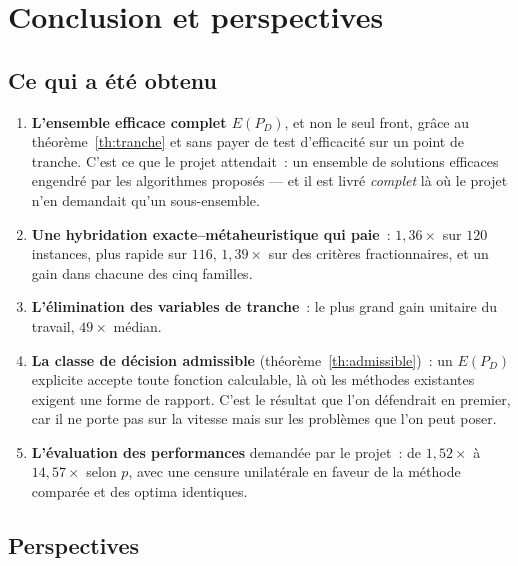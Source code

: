 \documentclass[12pt,a4paper]{report}
\newcommand{\E}{E(P_D)}
\theoremstyle{plain}
\theoremstyle{definition}
\begin{document}
\chapter{Conclusion et perspectives}

\section{Ce qui a été obtenu}

\begin{enumerate}[itemsep=4pt]
\item \textbf{L'ensemble efficace complet $\E$}, et non le seul front, grâce au
      théorème~\ref{th:tranche} et sans payer de test d'efficacité sur un point
      de tranche.  C'est ce que le projet attendait~: un ensemble de solutions
      efficaces engendré par les algorithmes proposés --- et il est livré
      \emph{complet} là où le projet n'en demandait qu'un sous-ensemble.
\item \textbf{Une hybridation exacte--métaheuristique qui paie}~: $1{,}36\times$
      sur $120$ instances, plus rapide sur $116$, $1{,}39\times$ sur des
      critères fractionnaires, et un gain dans chacune des cinq familles.
\item \textbf{L'élimination des variables de tranche}~: le plus grand gain
      unitaire du travail, $49\times$ médian.
\item \textbf{La classe de décision admissible} (théorème~\ref{th:admissible})~:
      un $\E$ explicite accepte toute fonction calculable, là où les méthodes
      existantes exigent une forme de rapport.  C'est le résultat que l'on
      défendrait en premier, car il ne porte pas sur la vitesse mais sur les
      problèmes que l'on peut poser.
\item \textbf{L'évaluation des performances} demandée par le projet~: de
      $1{,}52\times$ à $14{,}57\times$ selon $p$, avec une censure unilatérale
      en faveur de la méthode comparée et des optima identiques.
\end{enumerate}

\section{Perspectives}
\end{document}
